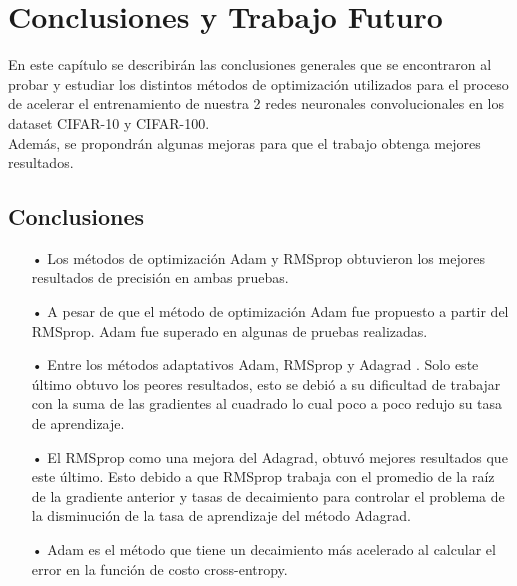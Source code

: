\chapter{Conclusiones y Trabajo Futuro}
En este capítulo se describirán las conclusiones generales que se encontraron al probar y estudiar los distintos métodos de optimización utilizados para el proceso de acelerar el entrenamiento de nuestra 2 redes neuronales convolucionales en los dataset CIFAR-10 y CIFAR-100.\\ Además, se propondrán algunas mejoras para que el trabajo obtenga mejores resultados.


\section{Conclusiones}


\begin{itemize}

\item[•] Los métodos de optimización Adam y RMSprop obtuvieron los mejores resultados de precisión en ambas pruebas.

\item[•] A pesar de que el método de optimización Adam fue propuesto a partir del RMSprop. Adam fue superado en algunas de pruebas realizadas.
\item[•] Entre los métodos adaptativos Adam, RMSprop y Adagrad . Solo este último obtuvo los peores resultados, esto se debió a su dificultad de trabajar con la suma de las gradientes al cuadrado lo cual poco a poco redujo su tasa de aprendizaje.
\item[•] El RMSprop como una mejora del Adagrad, obtuvó mejores resultados que este último. Esto debido a que RMSprop trabaja con el promedio de la raíz de la gradiente anterior y tasas de decaimiento para controlar el problema de la disminución de la tasa de aprendizaje del método Adagrad.
\item[•] Adam es el método que tiene un decaimiento más acelerado al calcular el error en la función de costo cross-entropy.

\end{itemize}


